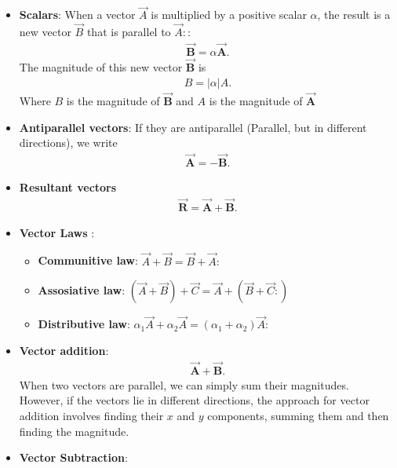 \documentclass{report}
\begin{document}
\begin{itemize}
        \item \textbf{Scalars}: When a vector $\vec{A}$ is multiplied by a positive scalar $\alpha$, the result is a new vector $\vec{B}$ that is parallel to $\vec{A}:$:
            \begin{align*}
                \vec{\textbf{B}} = \alpha \vec{\textbf{A}}
            .\end{align*}
            The magnitude of this new vector $\vec{\textbf{B}}$ is 
            \begin{align*}
                B = |\alpha|A
            .\end{align*}
            Where $B$ is the magnitude of $\vec{\textbf{B}} $ and $A$ is the magnitude of $\vec{\textbf{A}} $ 
        \item \textbf{Antiparallel vectors}: If they are antiparallel (Parallel, but in different directions), we write
            \begin{align*}
                \vec{\textbf{A}} = -\vec{\textbf{B}} 
            .\end{align*}
        \item \textbf{Resultant vectors}
            \begin{align*}
                \vec{\mathbf{R}} = \vec{\mathbf{A}} + \vec{\mathbf{B}}
            .\end{align*}
        \item \textbf{Vector Laws }:
            \begin{itemize}
                \item \textbf{Communitive law}: $\vec{A} + \vec{B} = \vec{B} + \vec{A}:$
                \item \textbf{Assosiative law}: $(\vec{A} + \vec{B}) + \vec{C} = \vec{A} + (\vec{B} + \vec{C}:)$ 
                \item \textbf{Distributive law}: $\alpha_1 \vec{A} + \alpha_2 \vec{A} = (\alpha_1 + \alpha_2)\vec{A}:$
            \end{itemize}
        \item \textbf{Vector addition}:
            \begin{align*}
               \vec{\textbf{A}} + \vec{\textbf{B}} 
            .\end{align*}
            When two vectors are parallel, we can simply sum their magnitudes. However, if the vectors lie in different directions, the approach for vector addition involves finding their $x$ and $y$ components, summing them and then finding the magnitude. 
        \item \textbf{Vector Subtraction}:

\end{itemize}
\end{document}

